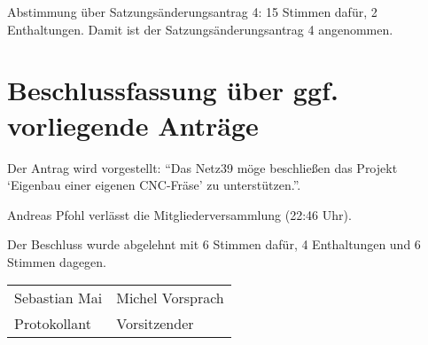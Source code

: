 \documentclass[a4paper,12pt,titlepage]{scrartcl}
\begin{document}
Abstimmung über Satzungsänderungsantrag 4: 15 Stimmen dafür, 2 Enthaltungen. Damit ist der Satzungsänderungsantrag 4 angenommen.

\section{Beschlussfassung über ggf. vorliegende Anträge}

Der Antrag wird vorgestellt: \enquote{Das Netz39 möge beschließen das Projekt \enquote{Eigenbau einer eigenen CNC-Fräse} zu unterstützen.}.

Andreas Pfohl verlässt die Mitgliederversammlung (22:46 Uhr).

Der Beschluss wurde abgelehnt mit 6 Stimmen dafür, 4 Enthaltungen und 6 Stimmen dagegen.

\nopagebreak
\vspace{10\baselineskip}
\begin{tabularx}{\textwidth}[b]{X X}
	\hline
	Sebastian Mai & Michel Vorsprach \\
	Protokollant & Vorsitzender
\end{tabularx}

\appendix

\end{document}
